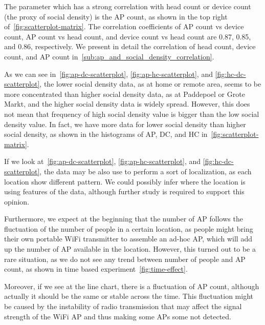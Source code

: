	The parameter which has a strong correlation with head count or device count (the proxy of social density) is the \ac{AP} count, as shown in the top right of~\autoref{fig:scatterplot-matrix}. The correlation coefficients of \ac{AP} count vs device count, \ac{AP} count vs head count, and device count vs head count are 0.87, 0.85, and 0.86, respectively. We present in detail the correlation of head count, device count, and \ac{AP} count in~\autoref{sub:ap_and_social_density_correlation}.

	As we can see in~\autoref{fig:ap-dc-scatterplot}, \autoref{fig:ap-hc-scatterplot}, and \autoref{fig:hc-dc-scatterplot}, the lower social density data, as at home or remote area, seems to be more concentrated than higher social density data, as at Paddepoel or Grote Markt, and the higher social density data is widely spread. However, this does not mean that frequency of high social density value is bigger than the low social density value. In fact, we have more data for lower social density than higher social density, as shown in the histograms of \ac{AP}, \ac{DC}, and \ac{HC} in~\autoref{fig:scatterplot-matrix}.

	If we look at~\autoref{fig:ap-dc-scatterplot}, \autoref{fig:ap-hc-scatterplot}, and \autoref{fig:hc-dc-scatterplot}, the data may be also use to perform a sort of localization, as each location show different pattern. We could possibly infer where the location is using features of the data, although further study is required to support this opinion.

	
	Furthermore, we expect at the beginning that the number of \ac{AP} follows the fluctuation of the number of people in a certain location, as people might bring their own portable WiFi transmitter to assemble an ad-hoc \ac{AP}, which will add up the number of \ac{AP} available in the location. However, this turned out to be a rare situation, as we do not see any trend between number of people and \ac{AP} count, as shown in time based experiment~\autoref{fig:time-effect}.

	Moreover, if we see at the line chart, there is a fluctuation of \ac{AP} count, although actually it should be the same or stable across the time. This fluctuation might be caused by the instability of radio transmission that may affect the signal strength of the WiFi \ac{AP} and thus making some \ac{AP}s some not detected.
	
